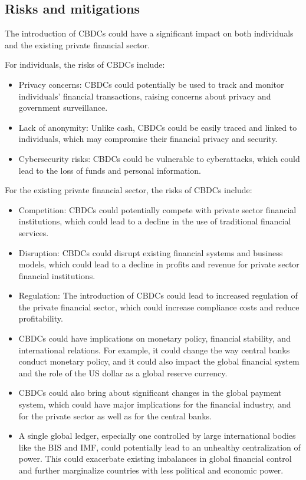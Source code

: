 \begin{itemize}
\subsection{Risks and mitigations}
The introduction of CBDCs could have a significant impact on both individuals and the existing private financial sector.\par
For individuals, the risks of CBDCs include:
\begin{itemize}
\item Privacy concerns: CBDCs could potentially be used to track and monitor individuals' financial transactions, raising concerns about privacy and government surveillance.
\item Lack of anonymity: Unlike cash, CBDCs could be easily traced and linked to individuals, which may compromise their financial privacy and security.
\item Cybersecurity risks: CBDCs could be vulnerable to cyberattacks, which could lead to the loss of funds and personal information.
\end{itemize}
For the existing private financial sector, the risks of CBDCs include:
\begin{itemize}
\item Competition: CBDCs could potentially compete with private sector financial institutions, which could lead to a decline in the use of traditional financial services.
\item Disruption: CBDCs could disrupt existing financial systems and business models, which could lead to a decline in profits and revenue for private sector financial institutions.
\item Regulation: The introduction of CBDCs could lead to increased regulation of the private financial sector, which could increase compliance costs and reduce profitability.
\item CBDCs could have implications on monetary policy, financial stability, and international relations. For example, it could change the way central banks conduct monetary policy, and it could also impact the global financial system and the role of the US dollar as a global reserve currency. 
\item CBDCs could also bring about significant changes in the global payment system, which could have major implications for the financial industry, and for the private sector as well as for the central banks.
\item A single global ledger, especially one controlled by large international bodies like the BIS and IMF, could potentially lead to an unhealthy centralization of power. This could exacerbate existing imbalances in global financial control and further marginalize countries with less political and economic power.

\end{itemize}
\end{itemize}
